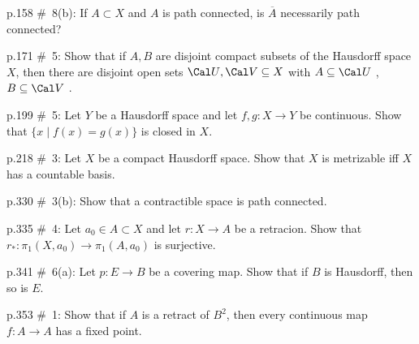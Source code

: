 \msk



p.158 \#\  8(b): If $A \subset X$ and $A$ is path connected,
is $\overline{A}$ necessarily path connected?



\msk



p.171 \#\  5: Show that if $A,B$ are disjoint compact subsets of the Hausdorff space $X$, then there
are disjoint open sets ${\Cal U},{\Cal V}\subseteq X$ with $A\subseteq {\Cal U}$ , $B\subseteq{\Cal V}$ .



\msk




p.199 \#\  5: Let $Y$ be a Hausdorff space and let
 $f,g:X \rightarrow Y$ be continuous.  
Show that $\{x \mid f(x)=g(x)\}$ is closed in $X$.



\msk



p.218 \#\  3: Let $X$ be a compact Hausdorff space.  Show that
 $X$ is metrizable iff $X$ has a countable basis.



\msk



p.330 \#\  3(b): Show that a contractible space is path connected.



\msk



p.335 \#\  4: Let $a_0 \in A \subset X$ and let
$r:X \rightarrow A$ be a retracion.  
Show that 
$r_*:\pi_1(X,a_0) \rightarrow \pi_1(A,a_0)$ is surjective.




\msk



p.341 \#\  6(a): Let $p:E \rightarrow B$ be a covering map.
 Show that if $B$ is Hausdorff, then so is $E$.



\msk



p.353 \#\  1: Show that if $A$ is a retract of $B^2$, then
 every continuous map $f:A \rightarrow A$ has a fixed point.














